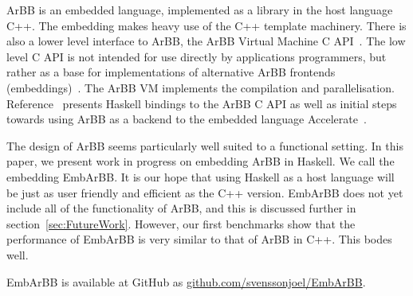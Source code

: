 
 

ArBB is an embedded language, implemented
as a library in the host language C++. The embedding makes 
heavy use of the C++ template machinery. There is also a lower level 
interface to ArBB, the ArBB Virtual Machine C API~. The low level C API is not
intended for use directly by applications programmers, but rather as a base 
for implementations of alternative ArBB frontends (embeddings)~.
The ArBB VM implements the compilation and parallelisation.
Reference~ presents Haskell bindings to the ArBB C API as well as initial 
steps towards using ArBB as a backend to the embedded language Accelerate~. 

The design of ArBB seems particularly well suited to a functional setting.
In this paper, we present work in progress on embedding ArBB in Haskell. We call the embedding EmbArBB.
It is our hope that using 
Haskell as a host language will be just as user friendly and efficient as 
the C++ version. EmbArBB does not yet include all of the functionality of ArBB,
and this is discussed further in section~\ref{sec:FutureWork}.
However,  our first benchmarks show that the performance of EmbArBB is very similar to that of ArBB in C++. This bodes well. 

EmbArBB is available at GitHub as 
\newline
\url{github.com/svenssonjoel/EmbArBB}.

